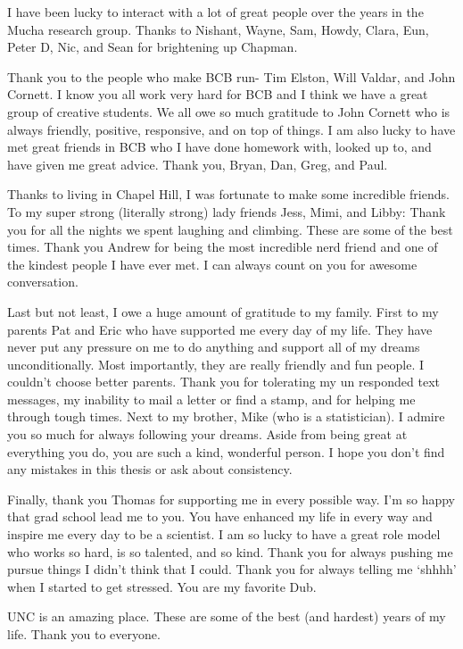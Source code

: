 I have been lucky to interact with a lot of great people over the years in the Mucha research group. Thanks to Nishant, Wayne, Sam, Howdy, Clara, Eun, Peter D, Nic, and Sean for brightening up Chapman.

Thank you to the people who make BCB run- Tim Elston, Will Valdar, and John Cornett. I know you all work very hard for BCB and I think we have a great group of creative students. We all owe so much gratitude to John Cornett who is always friendly, positive, responsive, and on top of things. I am also lucky to have met great friends in BCB who I have done homework with, looked up to, and have given me great advice. Thank you, Bryan, Dan, Greg, and Paul. 

Thanks to living in Chapel Hill, I was fortunate to make some incredible friends. To my super strong (literally strong) lady friends Jess, Mimi, and Libby: Thank you for all the nights we spent laughing and climbing. These are some of the best times. Thank you Andrew for being the most incredible nerd friend and one of the kindest people I have ever met. I can always count on you for awesome conversation. 

Last but not least, I owe a huge amount of gratitude to my family. First to my parents Pat and Eric who have supported me every day of my life. They have never put any pressure on me to do anything and support all of my dreams unconditionally. Most importantly, they are really friendly and fun people. I couldn't choose better parents. Thank you for tolerating my un responded text messages, my inability to mail a letter or find a stamp, and for helping me through tough times. Next to my brother, Mike (who is a statistician). I admire you so much for always following your dreams. Aside from being great at everything you do, you are such a kind, wonderful person. I hope you don't find any mistakes in this thesis or ask about consistency. 

Finally, thank you Thomas for supporting me in every possible way. I'm so happy that grad school lead me to you. You have enhanced my life in every way and inspire me every day to be a scientist. I am so lucky to have a great role model who works so hard, is so talented, and so kind. Thank you for always pushing me pursue things I didn't think that I could. Thank you for always telling me `shhhh' when I started to get stressed. You are my favorite Dub.

UNC is an amazing place. These are some of the best (and hardest) years of my life. Thank you to everyone.    

\clearpage
